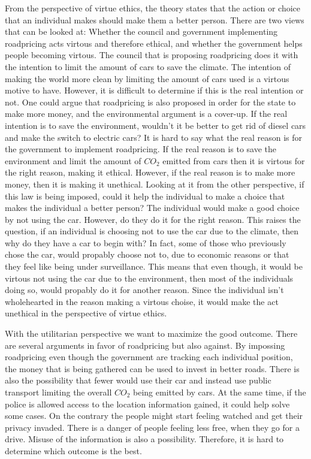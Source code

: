 From the perspective of virtue ethics, the theory states that the action or choice that an individual makes should make them a better person. There are two views that can be looked at: Whether the council and government implementing roadpricing acts virtous and therefore ethical, and whether the government helps people becoming virtous. The council that is proposing roadpricing does it with the intention to limit the amount of cars to save the climate. The intention of making the world more clean by limiting the amount of cars used is a virtous motive to have. However, it is difficult to determine if this is the real intention or not. One could argue that roadpricing is also proposed in order for the state to make more money, and the environmental argument is a cover-up. If the real intention is to save the environment, wouldn't it be better to get rid of diesel cars and make the switch to electric cars? It is hard to say what the real reason is for the government to implement roadpricing. If the real reason is to save the environment and limit the amount of $CO_2$ emitted from cars then it is virtous for the right reason, making it ethical. However, if the real reason is to make more money, then it is making it unethical.   
Looking at it from the other perspective, if this law is being imposed, could it help the individual to make a choice that makes the individual a better person? The individual would make a good choice by not using the car. However, do they do it for the right reason. This raises the question, if an individual is choosing not to use the car due to the climate, then why do they have a car to begin with?  
In fact, some of those who previously chose the car, would propably choose not to, due to economic reasons or that they feel like being under surveillance. This means that even though, it would be virtous not using the car due to the environment, then most of the individuals doing so, would propably do it for another reason. Since the individual isn't wholehearted in the reason making a virtous choise, it would make the act unethical in the perspective of virtue ethics.

With the utilitarian perspective we want to maximize the good outcome. There are several arguments in favor of roadpricing but also against. By impossing roadpricing even though the government are tracking each individual position, the money that is being gathered can be used to invest in better roads. There is also the possibility that fewer would use their car and instead use public transport limiting the overall $CO_2$ being emitted by cars. At the same time, if the police is allowed access to the location information gained, it could help solve some cases. On the contrary the people might start feeling watched and get their privacy invaded. There is a danger of people feeling less free, when they go for a drive. Misuse of the information is also a possibility. Therefore, it is hard to determine which outcome is the best.